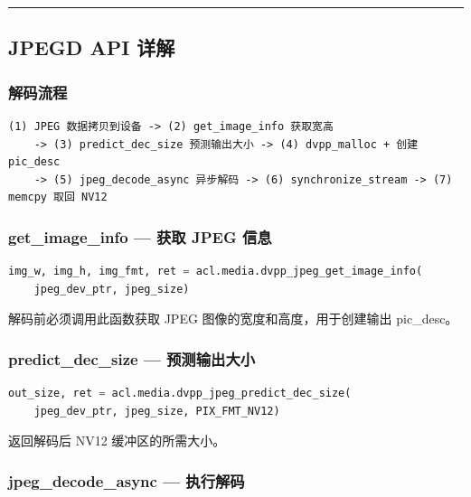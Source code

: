 \begin{center}\rule{0.5\linewidth}{0.5pt}\end{center}

\subsection{JPEGD API 详解}\label{src-book-chapter6-h125}

\subsubsection{解码流程}\label{src-book-chapter6-h126}

\begin{lstlisting}
(1) JPEG 数据拷贝到设备 -> (2) get_image_info 获取宽高
    -> (3) predict_dec_size 预测输出大小 -> (4) dvpp_malloc + 创建 pic_desc
    -> (5) jpeg_decode_async 异步解码 -> (6) synchronize_stream -> (7) memcpy 取回 NV12
\end{lstlisting}

\subsubsection{get\_image\_info --- 获取 JPEG
信息}\label{src-book-chapter6-h127}

\begin{lstlisting}[language=Python]
img_w, img_h, img_fmt, ret = acl.media.dvpp_jpeg_get_image_info(
    jpeg_dev_ptr, jpeg_size)
\end{lstlisting}

解码前必须调用此函数获取 JPEG 图像的宽度和高度，用于创建输出 pic\_desc。

\subsubsection{predict\_dec\_size ---
预测输出大小}\label{src-book-chapter6-h128}

\begin{lstlisting}[language=Python]
out_size, ret = acl.media.dvpp_jpeg_predict_dec_size(
    jpeg_dev_ptr, jpeg_size, PIX_FMT_NV12)
\end{lstlisting}

返回解码后 NV12 缓冲区的所需大小。

\subsubsection{jpeg\_decode\_async ---
执行解码}\label{src-book-chapter6-h129}

